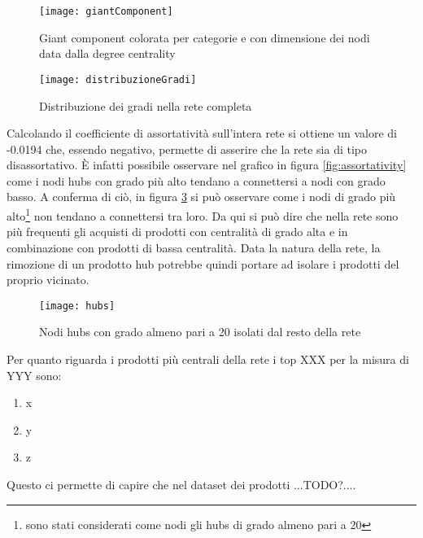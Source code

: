 \begin{figure}[]
    \texttt{[image: giantComponent]}\centering
    \caption{Giant component colorata per categorie e con dimensione dei nodi data dalla degree centrality}\label{fig:giantComponent}
\end{figure}

\begin{figure}[H]
    \texttt{[image: distribuzioneGradi]}\centering
    \caption{Distribuzione dei gradi nella rete completa}\label{fig:distribuzioneGradi}
\end{figure}

Calcolando il coefficiente di assortatività sull'intera rete si ottiene un valore di -0.0194 che, essendo negativo, permette di asserire che la rete sia di tipo disassortativo. È infatti possibile osservare nel grafico in figura \ref{fig:assortativity} come i nodi hubs con grado più alto tendano a connettersi a nodi con grado basso. A conferma di ciò, in figura \ref{fig:hubs} si può osservare come i nodi di grado più alto\footnote{sono stati considerati come nodi gli hubs di grado almeno pari a 20} non tendano a connettersi tra loro. Da qui si può dire che nella rete sono più frequenti gli acquisti di prodotti con centralità di grado alta e in combinazione con prodotti di bassa centralità. Data la natura della rete, la rimozione di un prodotto hub potrebbe quindi portare ad isolare i prodotti del proprio vicinato. 
\begin{figure}[H]
    \texttt{[image: hubs]}\centering
    \caption{Nodi hubs con grado almeno pari a 20 isolati dal resto della rete}\label{fig:hubs}
\end{figure}

Per quanto riguarda i prodotti più centrali della rete i top XXX per la misura di YYY sono:
\begin{enumerate}
    \item x
    \item y
    \item z
\end{enumerate}
Questo ci permette di capire che nel dataset dei prodotti ...TODO?....


